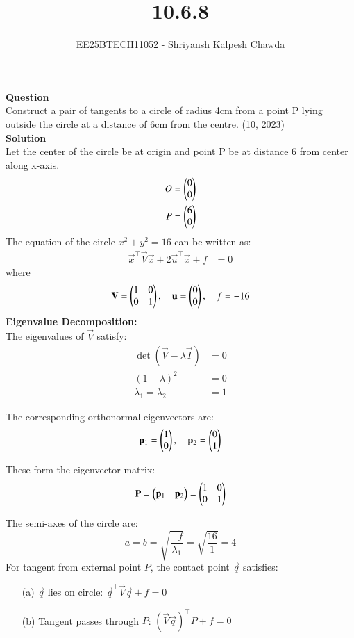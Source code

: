 \documentclass[article]{IEEEtran}
\begin{document}
	\title{10.6.8}
	\author{EE25BTECH11052 - Shriyansh Kalpesh Chawda}
	\maketitle
	\textbf{Question}\\
	Construct a pair of tangents to a circle of radius 4cm from a point P lying outside the circle at 
	a distance of 6cm from the centre.
	\hfill{(10, 2023)}\\
	
	\textbf{Solution}\\
	Let the center of the circle be at origin and point P be at distance 6 from center along x-axis.
	\begin{align}
		O &= \begin{pmatrix}0\\0\end{pmatrix}\\
		P &= \begin{pmatrix}6\\0\end{pmatrix}
	\end{align}
The equation of the circle $x^2 + y^2 = 16$ can be written as:
	\begin{align}
		\vec{x}^\top \vec{V} \vec{x} + 2\vec{u}^\top \vec{x} + f &= 0
	\end{align}
	where
	\begin{equation}
		\mathbf{V} = \begin{pmatrix}1 & 0\\0 & 1\end{pmatrix}, \quad \mathbf{u} = \begin{pmatrix}0\\0\end{pmatrix}, \quad f = -16
	\end{equation}
\textbf{Eigenvalue Decomposition:}\\
	The eigenvalues of $\vec{V}$ satisfy:
	\begin{align}
		\det(\vec{V} - \lambda\vec{I}) &= 0\\
		(1-\lambda)^2 &= 0\\
		\lambda_1 = \lambda_2 &= 1
	\end{align}
	
	The corresponding orthonormal eigenvectors are:
	\begin{equation}
		\mathbf{p}_1 = \begin{pmatrix}1\\0\end{pmatrix}, \quad \mathbf{p}_2 = \begin{pmatrix}0\\1\end{pmatrix}
	\end{equation}
	
	These form the eigenvector matrix:
	\begin{equation}
		\mathbf{P} = \begin{pmatrix}\mathbf{p}_1 & \mathbf{p}_2\end{pmatrix} = \begin{pmatrix}1 & 0\\0 & 1\end{pmatrix}
	\end{equation}
	
	The semi-axes of the circle are:
	\begin{equation}
		a = b = \sqrt{\frac{-f}{\lambda_1}} = \sqrt{\frac{16}{1}} = 4
	\end{equation}
	For tangent from external point $P$, the contact point $\vec{q}$ satisfies:
	\begin{enumerate}
		\item[(a)] $\vec{q}$ lies on circle: $\vec{q}^\top\vec{V}\vec{q} + f = 0$
		\item[(b)] Tangent passes through $P$: $(\vec{V}\vec{q})^\top P + f = 0$
	\end{enumerate}
	
\end{document}
